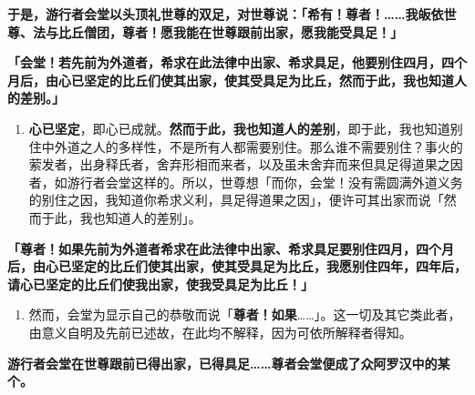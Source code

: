 \textbf{于是，游行者会堂以头顶礼世尊的双足，对世尊说：「希有！尊者！……我皈依世尊、法与比丘僧团，尊者！愿我能在世尊跟前出家，愿我能受具足！」}

\textbf{「会堂！若先前为外道者，希求在此法律中出家、希求具足，他要别住四月，四个月后，由心已坚定的比丘们使其出家，使其受具足为比丘，然而于此，我也知道人的差别。」}

\begin{enumerate}\item \textbf{心已坚定}，即心已成就。\textbf{然而于此，我也知道人的差别}，即于此，我也知道别住中外道之人的多样性，不是所有人都需要别住。那么谁不需要别住？事火的萦发者，出身释氏者，舍弃形相而来者，以及虽未舍弃而来但具足得道果之因者，如游行者会堂这样的。所以，世尊想「而你，会堂！没有需圆满外道义务的别住之因，我知道你希求义利，具足得道果之因」，便许可其出家而说「然而于此，我也知道人的差别」。\end{enumerate}

\textbf{「尊者！如果先前为外道者希求在此法律中出家、希求具足要别住四月，四个月后，由心已坚定的比丘们使其出家，使其受具足为比丘，我愿别住四年，四年后，请心已坚定的比丘们使我出家，使我受具足为比丘！」}

\begin{enumerate}\item 然而，会堂为显示自己的恭敬而说「\textbf{尊者！如果}……」。这一切及其它类此者，由意义自明及先前已述故，在此均不解释，因为可依所解释者得知。\end{enumerate}

\textbf{游行者会堂在世尊跟前已得出家，已得具足……尊者会堂便成了众阿罗汉中的某个。}


